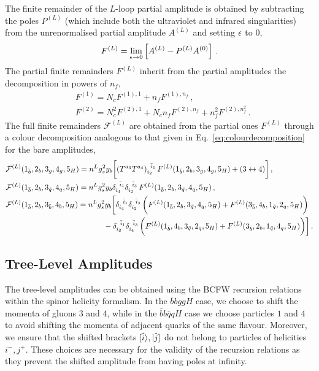 \documentclass[main.tex]{subfiles}
\begin{document}
The finite remainder of the $L$-loop partial amplitude is obtained by subtracting the poles $P^{(L)}$ (which include both the ultraviolet and infrared singularities) from the unrenormalised partial amplitude $A^{(L)}$ and setting $\epsilon$ to $0$,
\begin{equation}
F^{(L)} = \lim_{\epsilon \to 0} \left[ A^{(L)} - P^{(L)} A^{(0)} \right]\,.
\label{eq:finiteremainder}
\end{equation}
The partial finite remainders $F^{(L)}$ inherit from the partial amplitudes the decomposition in powers of $n_f$,
\begin{align}
& F^{(1)} = N_c F^{(1),1} + n_f F^{(1),n_f}  \,,  
\label{eq:NfDecomposition1LF} \\
& F^{(2)} = N_c^2 F^{(2),1} + N_c n_f F^{(2),n_f} + n_f^2 F^{(2),n_f^2}  \,.
\label{eq:NfDecomposition2LF}
\end{align}
The full finite remainders $\mathcal{F}^{(L)}$ are obtained from the partial ones $F^{(L)}$ through a colour decomposition analogous to that given in Eq.~\eqref{eq:colourdecomposition} for the bare amplitudes,
\begin{align}
&\mathcal{F}^{(L)}(1_{\bar b},2_{b},3_{g},4_{g} ,5_{H}) = n^L g_s^2 y_b \bigg[ 
  (T^{a_3} T^{a_4})_{i_2}^{\;\;\bar i_1} \,  F^{(L)}(1_{\bar b},2_{b},3_{g},4_{g} ,5_{H}) + ( 3 \leftrightarrow 4 ) \bigg]\,, \nonumber\\
&\mathcal{F}^{(L)}(1_{\bar b},2_{b},3_{\bar{q}},4_{q} ,5_{H}) = n^L  g_s^2 y_b 
 \delta_{i_4}^{\;\;\bar i_1} \delta_{i_2}^{\;\;\bar i_3}  \,
  F^{(L)}(1_{\bar b},2_{b},3_{\bar{q}},4_{q} ,5_{H}) \,,  \label{eq:colourdecompositionF} \\
&\mathcal{F}^{(L)}(1_{\bar b},2_{b},3_{\bar{b}},4_{b} ,5_{H}) = n^L  g_s^2 y_b \bigg[
  \delta_{i_4}^{\;\;\bar i_1} \delta_{i_2}^{\;\;\bar i_3}  \, \biggl( F^{(L)}(1_{\bar b},2_{b},3_{\bar{q}},4_{q} ,5_{H}) + F^{(L)}(3_{\bar b},4_{b},1_{\bar{q}},2_{q} ,5_{H}) \biggr) \,  \nonumber\\
& \hspace{4.5cm} -\delta_{i_2}^{\;\;\bar i_1} \delta_{i_4}^{\;\;\bar i_3}  \, \biggl( F^{(L)}(1_{\bar b},4_{b},3_{\bar{q}},2_{q} ,5_{H}) + F^{(L)}(3_{\bar b},2_{b},1_{\bar{q}},4_{q} ,5_{H}) \biggr) \bigg]\,.
\nonumber 
\end{align}


\subsection{Tree-Level Amplitudes}
\label{Hbbsec:trees}
The tree-level amplitudes can be obtained using the BCFW recursion relations~\cite{Britto:2004ap,Britto:2005fq} within the spinor helicity formalism. In the $\bar{b}bggH$ case, we choose to shift the momenta of gluons $3$ and $4$, while in the $\bar{b}b\bar{q}qH$ case we choose particles $1$ and $4$ to avoid shifting the momenta of adjacent quarks of the same flavour. Moreover, we ensure that the shifted brackets $[\hat{i}\rangle, |\hat{j}]$ do not belong to particles of helicities $i^-, j^+$. These choices are necessary for the validity of the recursion relations as they prevent the shifted amplitude from having poles at infinity.
\end{document}
